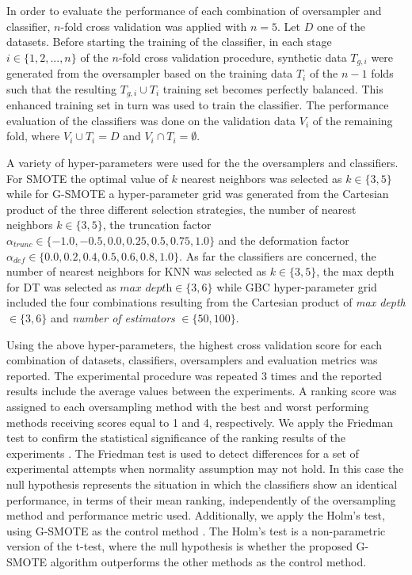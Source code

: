 \documentclass[parskip=full]{scrartcl}
\begin{document}
In order to evaluate the performance of each combination of oversampler and
classifier, \( n \)-fold cross validation was applied with \( n = 5 \). Let
\(D\) one of the datasets. Before starting the training of the classifier, in
each stage \(i \in \{1, 2 ,... , n \} \) of the \( n \)-fold cross validation
procedure, synthetic data \( T_{g, i} \) were generated from the oversampler
based on the training data \(T_{i} \) of the \( n - 1 \) folds such that the
resulting \(T_{g, i} \cup T_{i} \) training set becomes perfectly balanced. This
enhanced training set in turn was used to train the classifier. The performance
evaluation of the classifiers was done on the validation data \( V_{i} \) of the
remaining fold, where \(V_{i} \cup T_{i} = D \) and \(V_{i} \cap T_{i} =
\emptyset \).

A variety of hyper-parameters were used for the the oversamplers and
classifiers. For SMOTE the optimal value of \( k \) nearest neighbors was
selected as \( k \in \{ 3, 5 \} \) while for G-SMOTE a hyper-parameter grid was
generated from the Cartesian product of the three different selection
strategies, the number of nearest neighbors \(k \in \{ 3, 5 \} \), the
truncation factor \( \alpha_{trunc} \in \{ -1.0, -0.5, 0.0, 0.25, 0.5, 0.75 ,
1.0 \} \) and the deformation factor \( \alpha_{def} \in \{ 0.0, 0.2, 0.4, 0.5,
0.6, 0.8, 1.0 \} \). As far the classifiers are concerned, the number of nearest
neighbors for KNN was selected as \( k \in \{ 3, 5 \} \),  the max depth for DT
was selected as \( \textit{max depth} \in \{ 3, 6 \} \) while GBC
hyper-parameter grid included the four combinations resulting from the Cartesian
product of  \textit{max depth} \( \in \{ 3 , 6 \} \) and \textit{number of
estimators} \( \in \{50, 100\} \).

Using the above hyper-parameters, the highest cross validation score for each
combination of datasets, classifiers, oversamplers and evaluation metrics was
reported. The experimental procedure was repeated 3 times and the reported
results include the average values between the experiments. A ranking score was
assigned to each oversampling method with the best and worst performing methods
receiving scores equal to 1 and 4, respectively. We apply the Friedman test to
confirm the statistical significance of the ranking results of the experiments
\cite{Guyon2003}. The Friedman test is used to detect differences for a set of
experimental attempts when normality assumption may not hold. In this case the
null hypothesis represents the situation in which the classifiers show an
identical performance, in terms of their mean ranking, independently of the
oversampling method and performance metric used.  Additionally, we apply the
Holm’s test, using G-SMOTE as the control method \cite{Guyon2003}. The Holm’s
test is a non-parametric version of the t-test, where the null hypothesis is
whether the proposed G-SMOTE algorithm outperforms the other methods as the
control method.
\end{document}
